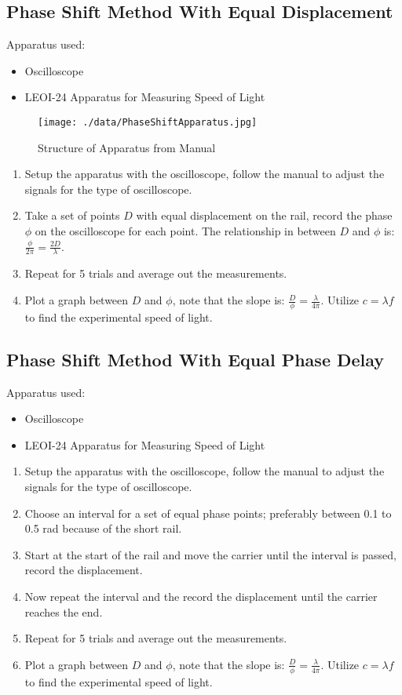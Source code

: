 \documentclass[12pt]{article}
\begin{document}
	\subsection{Phase Shift Method With Equal Displacement}
	Apparatus used:
	\begin{itemize}
		\item Oscilloscope
		\item LEOI-24 Apparatus for Measuring Speed of Light 
	\end{itemize}
	\begin{figure}[!h]
		\centering
		\caption{Structure of Apparatus from Manual}
		\label{PhaseShiftApparatus}
		\texttt{[image: ./data/PhaseShiftApparatus.jpg]}
	\end{figure}
	\begin{enumerate}
		\item Setup the apparatus with the oscilloscope, follow the manual to adjust the signals for the type of oscilloscope.
		\item Take a set of points $D$ with equal displacement on the rail, record the phase $\phi$ on the oscilloscope for each point. The relationship in between $D$ and $\phi$ is: $\frac{\phi}{2\pi} = \frac{2D}{\lambda}$.
		\item Repeat for 5 trials and average out the measurements.
		\item Plot a graph between $D$ and $\phi$, note that the slope is: $\frac{D}{\phi} = \frac{\lambda}{4\pi}$. Utilize $c = \lambda f$ to find the experimental speed of light.
	\end{enumerate}
	
\clearpage
	
	\subsection{Phase Shift Method With Equal Phase Delay}
	Apparatus used:
	\begin{itemize}
		\item Oscilloscope
		\item LEOI-24 Apparatus for Measuring Speed of Light 
	\end{itemize}
	\begin{enumerate}
		\item Setup the apparatus with the oscilloscope, follow the manual to adjust the signals for the type of oscilloscope.
		\item Choose an interval for a set of equal phase points; preferably between 0.1 to 0.5 rad because of the short rail. \item Start at the start of the rail and move the carrier until the interval is passed, record the displacement.
		\item Now repeat the interval and the record the displacement until the carrier reaches the end.
		\item Repeat for 5 trials and average out the measurements.
		\item Plot a graph between $D$ and $\phi$, note that the slope is: $\frac{D}{\phi} = \frac{\lambda}{4\pi}$. Utilize $c = \lambda f$ to find the experimental speed of light.
	\end{enumerate}
	
\end{document}
